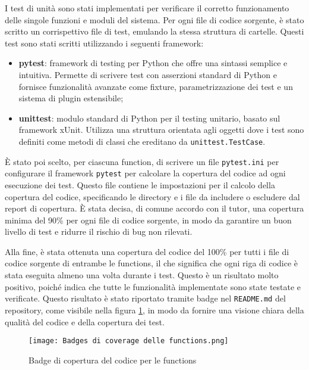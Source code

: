 I test di unità sono stati implementati per verificare il corretto funzionamento delle singole funzioni e moduli del sistema. Per ogni file di codice sorgente, è stato scritto un corrispettivo file di test, emulando la stessa struttura di cartelle. Questi test sono stati scritti utilizzando i seguenti framework:
\begin{itemize}
    \item \textbf{pytest}: framework di testing per Python che offre una sintassi semplice e intuitiva. Permette di scrivere test con asserzioni standard di Python e fornisce funzionalità avanzate come fixture, parametrizzazione dei test e un sistema di plugin estensibile;
    \item \textbf{unittest}: modulo standard di Python per il testing unitario, basato sul framework xUnit. Utilizza una struttura orientata agli oggetti dove i test sono definiti come metodi di classi che ereditano da \texttt{unittest.TestCase}.
\end{itemize}

È stato poi scelto, per ciascuna function, di scrivere un file \texttt{pytest.ini} per configurare il framework \texttt{pytest} per calcolare la copertura del codice ad ogni esecuzione dei test. Questo file contiene le impostazioni per il calcolo della copertura del codice, specificando le directory e i file da includere o escludere dal report di copertura. È stata decisa, di comune accordo con il tutor, una copertura minima del 90\% per ogni file di codice sorgente, in modo da garantire un buon livello di test e ridurre il rischio di bug non rilevati.

Alla fine, è stata ottenuta una copertura del codice del 100\% per tutti i file di codice sorgente di entrambe le functions, il che significa che ogni riga di codice è stata eseguita almeno una volta durante i test. Questo è un risultato molto positivo, poiché indica che tutte le funzionalità implementate sono state testate e verificate.
Questo risultato è stato riportato tramite badge nel \texttt{README.md} del repository, come visibile nella figura \ref{fig:coverage-badges}, in modo da fornire una visione chiara della qualità del codice e della copertura dei test.

\begin{figure}
    \centering
    \texttt{[image: Badges di coverage delle functions.png]}
    \caption{Badge di copertura del codice per le functions}
    \label{fig:coverage-badges}
\end{figure}


